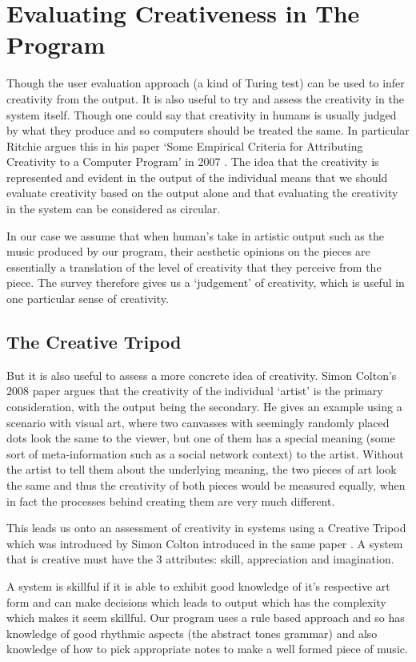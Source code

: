 \documentclass[pdftex,12pt,a4paper]{report}
\begin{document}
\section{Evaluating Creativeness in The Program}
Though the user evaluation approach (a kind of Turing test) can be used to infer creativity from the output. It is also useful to try and assess the creativity in the system itself. Though one could say that creativity in humans is usually judged by what they produce and so computers should be treated the same. In particular Ritchie argues this in his paper `Some Empirical Criteria for Attributing Creativity to a Computer Program' in 2007 \cite{ritchie07}. The idea that the creativity is represented and evident in the output of the individual means that we should evaluate creativity based on the output alone and that evaluating the creativity in the system can be considered as circular.

In our case we assume that when human's take in artistic output such as the music produced by our program, their aesthetic opinions on the pieces are essentially a translation of the level of creativity that they perceive from the piece. The survey therefore gives us a `judgement' of creativity, which is useful in one particular sense of creativity.

\subsection{The Creative Tripod}
But it is also useful to assess a more concrete idea of creativity. Simon Colton's 2008 paper \cite{colton08} argues that the creativity of the individual `artist' is the primary consideration, with the output being the secondary. He gives an example using a scenario with visual art, where two canvasses with seemingly randomly placed dots look the same to the viewer, but one of them has a special meaning (some sort of meta-information such as a social network context) to the artist. Without the artist to tell them about the underlying meaning, the two pieces of art look the same and thus the creativity of both pieces would be measured equally, when in fact the processes behind creating them are very much different.

This leads us onto an assessment of creativity in systems using a Creative Tripod which was introduced by Simon Colton introduced in the same paper \cite{colton08}. A system that is creative must have the 3 attributes: skill, appreciation and imagination. 

A system is skillful if it is able to exhibit good knowledge of it's respective art form and can make decisions which leads to output which has the complexity which makes it seem skillful. Our program uses a rule based approach and so has knowledge of good rhythmic aspects (the abstract tones grammar) and also knowledge of how to pick appropriate notes to make a well formed piece of music. 
\end{document}
